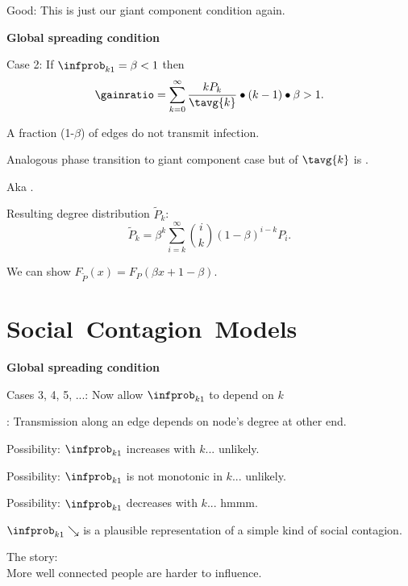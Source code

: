     \alert{Good:} This is just our giant component condition again.
  

  \textbf{Global spreading condition}

  
   
    \alert{Case 2:}
    {
      If $\infprob_{k1}=\beta<1$ 
    }
    {
      then
      $$
      \gainratio = 
      \sum_{k=0}^{\infty}
      \frac{kP_k}{\tavg{k}}
      \bullet
      (k-1)
      \bullet
      \beta > 1.
      $$
    }
   
    A fraction (1-$\beta$) of edges do not transmit 
    infection.
   
    Analogous phase transition to giant component case
    but  of $\tavg{k}$ is .
   
    Aka .
   
    Resulting degree distribution $\tilde{P}_k$:
    $$
    \tilde{P}_k
    =
    \beta^k
    \sum_{i=k}^{\infty}
    \binom{i}{k}
    (1-\beta)^{i-k}
    P_i.
    $$
   
    We can show $F_{\tilde{P}}(x) = F_{P}(\beta x + 1 - \beta)$.
  


\section{Social\ Contagion\ Models}

  \textbf{Global spreading condition}

  
  
    \alert{Cases 3, 4, 5, ...:}
    {
      Now allow $\infprob_{k1}$ to depend on $k$
    }
  
    : Transmission along an edge depends on
    node's degree at other end.
  
    Possibility: $\infprob_{k1}$ increases with $k$...
    {\alert{unlikely}}.
  
    Possibility: $\infprob_{k1}$ is not monotonic in $k$...
    {\alert{unlikely}}.
  
    Possibility: $\infprob_{k1}$ decreases with $k$...
    {\alert{hmmm}}.
  
    $\infprob_{k1} \searrow$ is a plausible representation
    of a simple kind of social contagion.
  
    \alert{The story:}\\
    More well connected people are harder to influence.
  


